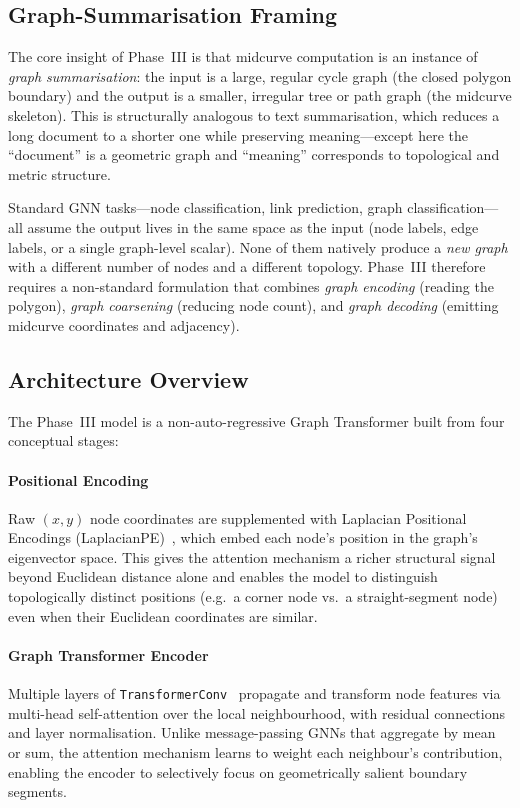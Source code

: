 \documentclass[journal]{IEEEtran}
\begin{document}
\subsection{Graph-Summarisation Framing}

The core insight of Phase~III is that midcurve computation is an instance of
\emph{graph summarisation}: the input is a large, regular cycle graph (the
closed polygon boundary) and the output is a smaller, irregular tree or path
graph (the midcurve skeleton).  This is structurally analogous to
text summarisation, which reduces a long document to a shorter one while
preserving meaning—except here the ``document'' is a geometric graph and
``meaning'' corresponds to topological and metric structure.

Standard GNN tasks—node classification, link prediction, graph
classification—all assume the output lives in the same space as the input (node
labels, edge labels, or a single graph-level scalar).  None of them natively
produce a \emph{new graph} with a different number of nodes and a different
topology.  Phase~III therefore requires a non-standard formulation that
combines \emph{graph encoding} (reading the polygon), \emph{graph coarsening}
(reducing node count), and \emph{graph decoding} (emitting midcurve coordinates
and adjacency).

\subsection{Architecture Overview}

The Phase~III model is a non-auto-regressive Graph Transformer built from
four conceptual stages:

\paragraph{Positional Encoding}
Raw $(x, y)$ node coordinates are supplemented with Laplacian Positional
Encodings (LaplacianPE)~\cite{dwivedi2022graphtransformer}, which embed each
node's position in the graph's eigenvector space.  This gives the attention
mechanism a richer structural signal beyond Euclidean distance alone and
enables the model to distinguish topologically distinct positions (e.g.\ a
corner node vs.\ a straight-segment node) even when their Euclidean
coordinates are similar.

\paragraph{Graph Transformer Encoder}
Multiple layers of \texttt{TransformerConv}~\cite{shi2020masked} propagate and
transform node features via multi-head self-attention over the local
neighbourhood, with residual connections and layer normalisation.  Unlike
message-passing GNNs that aggregate by mean or sum, the attention mechanism
learns to weight each neighbour's contribution, enabling the encoder to
selectively focus on geometrically salient boundary segments.
\end{document}
